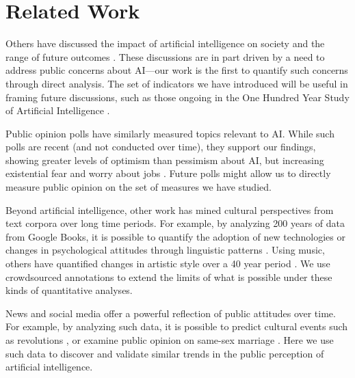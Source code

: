 \documentclass[letterpaper]{article}
\begin{document}
\section{Related Work}

Others have discussed the impact of artificial intelligence on society and the range of future outcomes \cite{ai-concerns}. These discussions are in part driven by a need to address public concerns about AI---our work is the first to quantify such concerns through direct analysis. The set of indicators we have introduced will be useful in framing future discussions, such as those ongoing in the One Hundred Year Study of Artificial Intelligence \cite{100years}.

Public opinion polls have similarly measured topics relevant to AI. While such polls are recent (and not conducted over time), they support our findings, showing greater levels of optimism than pessimism about AI, but increasing existential fear and worry about jobs \cite{bsa-poll,cbs-poll}. Future polls might allow us to directly measure public opinion on the set of measures we have studied.

Beyond artificial intelligence, other work has mined cultural perspectives from text corpora over long time periods. For example, by analyzing 200 years of data from Google Books, it is possible to quantify the adoption of new technologies or changes in psychological attitudes through linguistic patterns \cite{google-culture,psych-culture}. Using music, others have quantified changes in artistic style over a 40 year period \cite{music-over-time}. We use crowdsourced annotations to extend the limits of what is possible under these kinds of quantitative analyses.


News and social media offer a powerful reflection of public attitudes over time. For example, by analyzing such data, it is possible to predict cultural events such as revolutions \cite{future1,future2}, or examine public opinion on same-sex marriage \cite{marriage}. Here we use such data to discover and validate similar trends in the public perception of artificial intelligence.
\end{document}
